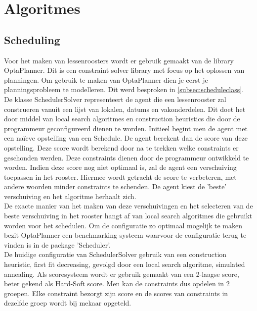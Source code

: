 \section{Algoritmes}
\label{sec:algorithms}
\subsection{Scheduling}
\label{subsec:scheduling}
Voor het maken van lessenroosters wordt er gebruik gemaakt van de library OptaPlanner\cite{optaplanner}. 
Dit is een constraint solver library met focus op het oplossen van planningen.
Om gebruik te maken van OptaPlanner dien je eerst je planningsprobleem te modelleren.
Dit werd besproken in \ref{subsec:scheduleclass}.\\

De klasse SchedulerSolver representeert de agent die een lessenrooster zal construeren vanuit een lijst van lokalen, datums en vakonderdelen.
Dit doet het door middel van local search algoritmes en construction heuristics die door de programmeur geconfigureerd dienen te worden.
Initieel begint men de agent met een na\"{i}eve opstelling van een Schedule.
De agent berekent dan de score van deze opstelling.
Deze score wordt berekend door na te trekken welke constraints er geschonden werden.
Deze constraints dienen door de programmeur ontwikkeld te worden.
Indien deze score nog niet optimaal is, zal de agent een verschuiving toepassen in het rooster.
Hiermee wordt getracht de score te verbeteren, met andere woorden minder constraints te schenden.
De agent kiest de 'beste' verschuiving en het algoritme herhaalt zich.\\

De exacte manier van het maken van deze verschuivingen en het selecteren van de beste verschuiving in het rooster hangt af van local search algoritmes die gebruikt worden voor het schedulen.
Om de configuratie zo optimaal mogelijk te maken bezit OptaPlanner een benchmarking systeem waarvoor de configuratie terug te vinden is in de package 'Scheduler'.\\

De huidige configuratie van SchedulerSolver gebruik van een construction heuristic, first fit decreasing, gevolgd door een local search algoritme, simulated annealing. 
Als scoresysteem wordt er gebruik gemaakt van een 2-laagse score, beter gekend als Hard-Soft score.
Men kan de constraints dus opdelen in 2 groepen.
Elke constraint bezorgt zijn score en de scores van constraints in dezelfde groep wordt bij mekaar opgeteld.\\

